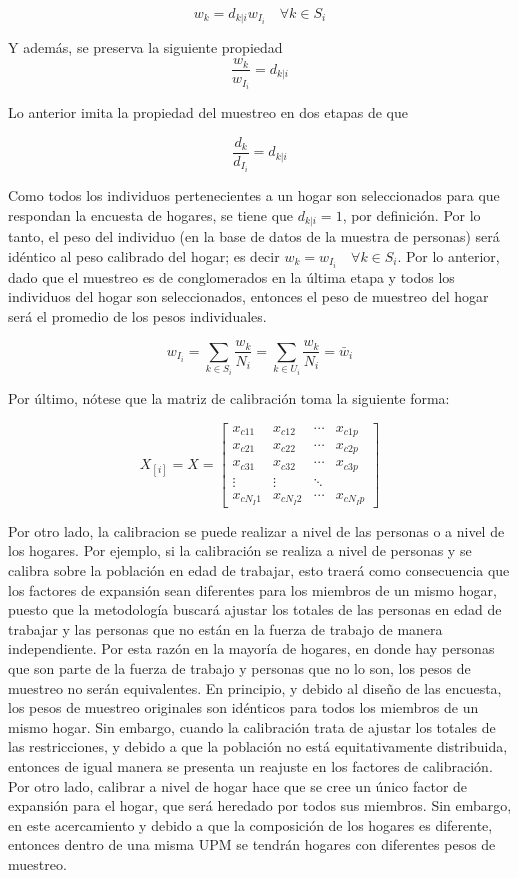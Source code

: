 \[
w_k = d_{k|i}w_{I_i} \quad \forall k \in S_i
\]

Y además, se preserva la siguiente propiedad
\[
\frac{w_k}{w_{I_i}}=d_{k|i}
\]

Lo anterior imita la propiedad del muestreo en dos etapas de que

\[
\frac{d_k}{d_{I_i}}=d_{k|i}
\]

Como todos los individuos pertenecientes a un hogar son seleccionados para que respondan la encuesta de hogares, se tiene que \(d_{k|i} = 1\), por definición. Por lo tanto, el peso del individuo (en la base de datos de la muestra de personas) será idéntico al peso calibrado del hogar; es decir \(w_k = w_{I_i} \quad \forall k \in S_i\). Por lo anterior, dado que el muestreo es de conglomerados en la última etapa y todos los individuos del hogar son seleccionados, entonces el peso de muestreo del hogar será el promedio de los pesos individuales.

\[
w_{I_i}=\sum_{k\in S_i}\frac{w_k}{N_i}=\sum_{k\in U_i}\frac{w_k}{N_i}=\bar{w}_i
\]

Por último, nótese que la matriz de calibración toma la siguiente forma:

\[
X_{[i]}=X=
\begin{bmatrix}
x_{c11} & x_{c12} & \cdots & x_{c1p}\\
x_{c21} & x_{c22} & \cdots & x_{c2p}\\
x_{c31} & x_{c32} & \cdots & x_{c3p}\\
\vdots  & \vdots & \ddots &\\
x_{cN_I1} & x_{cN_I2} & \cdots & x_{cN_Ip}
\end{bmatrix}
\]

Por otro lado, la calibracion se puede realizar a nivel de las personas o a nivel de los hogares. Por ejemplo, si la calibración se realiza a nivel de personas y se calibra sobre la población en edad de trabajar, esto traerá como consecuencia que los factores de expansión sean diferentes para los miembros de un mismo hogar, puesto que la metodología buscará ajustar los totales de las personas en edad de trabajar y las personas que no están en la fuerza de trabajo de manera independiente. Por esta razón en la mayoría de hogares, en donde hay personas que son parte de la fuerza de trabajo y personas que no lo son, los pesos de muestreo no serán equivalentes. En principio, y debido al diseño de las encuesta, los pesos de muestreo originales son idénticos para todos los miembros de un mismo hogar. Sin embargo, cuando la calibración trata de ajustar los totales de las restricciones, y debido a que la población no está equitativamente distribuida, entonces de igual manera se presenta un reajuste en los factores de calibración. Por otro lado, calibrar a nivel de hogar hace que se cree un único factor de expansión para el hogar, que será heredado por todos sus miembros. Sin embargo, en este acercamiento y debido a que la composición de los hogares es diferente, entonces dentro de una misma UPM se tendrán hogares con diferentes pesos de muestreo.

